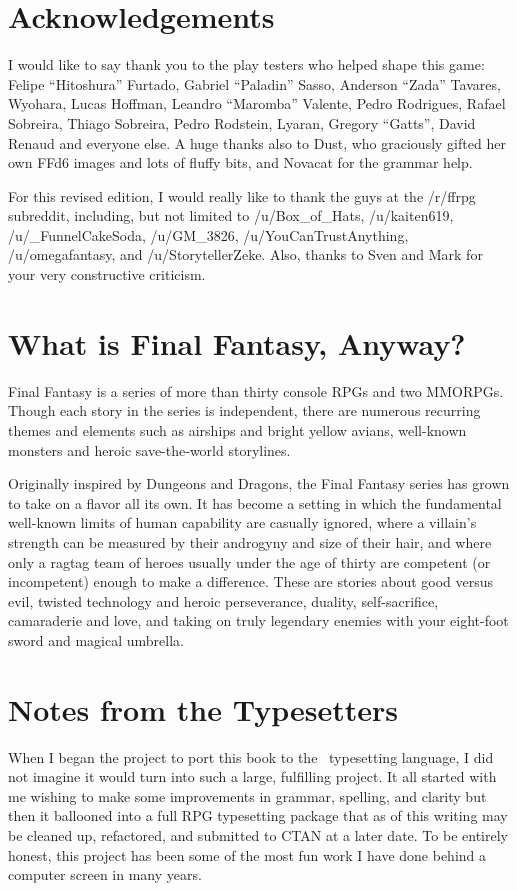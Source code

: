 \begin{multicols}{2}
\section{Acknowledgements}\label{sec:acknowledgements}
I would like to say thank you to the play testers who helped shape this game: Felipe ``Hitoshura'' Furtado, Gabriel ``Paladin'' Sasso, Anderson ``Zada'' Tavares, Wyohara, Lucas Hoffman, Leandro ``Maromba'' Valente, Pedro Rodrigues, Rafael Sobreira, Thiago Sobreira, Pedro Rodstein, Lyaran, Gregory ``Gatts'', David Renaud and everyone else. A huge thanks also to Dust, who graciously gifted her own FFd6 images and lots of fluffy bits, and Novacat for the grammar
help. \pw%

For this revised edition, I would really like to thank the guys at the /r/ffrpg subreddit, including, but not limited to /u/Box\_of\_Hats, /u/kaiten619, /u/\_FunnelCakeSoda, /u/GM\_3826, /u/YouCanTrustAnything, /u/omegafantasy, and /u/StorytellerZeke. Also, thanks to Sven and Mark for your very constructive criticism.

\section{What is Final Fantasy, Anyway?}\label{sec:whatff}
Final Fantasy is a series of more than thirty console RPGs and two MMORPGs. Though each story in the series is independent, there are numerous recurring themes and elements such as airships and bright yellow avians, well-known monsters and heroic save-the-world storylines.

Originally inspired by Dungeons and Dragons, the Final Fantasy series has grown to take on a flavor all its own. It has become a setting in which the fundamental well-known limits of human capability are casually ignored, where a villain’s strength can be measured by their androgyny and size of their hair, and where only a ragtag team of heroes usually under the age of thirty are competent (or incompetent) enough to make a difference. These are stories about good versus evil, twisted technology and heroic perseverance, duality, self-sacrifice, camaraderie and love, and taking on truly legendary enemies with your eight-foot sword and magical umbrella.

\section{Notes from the Typesetters}\label{sec:forward-typesetting}
When I began the project to port this book to the \XeLaTeX\ typesetting language, I did not imagine it would turn into such a large, fulfilling project. It all started with me wishing to make some improvements in grammar, spelling, and clarity but then it ballooned into a full RPG typesetting package that as of this writing may be cleaned up, refactored, and submitted to CTAN at a later date. To be entirely honest, this project has been some of the most fun work I have done behind a computer screen in many years.\pc%


\end{multicols}
